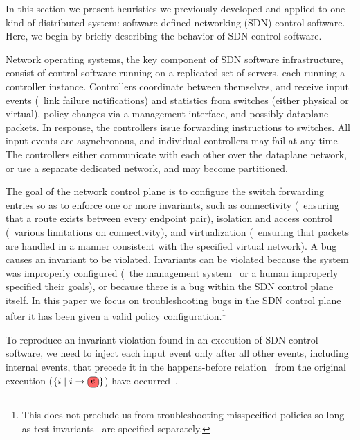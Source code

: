 In this section we present heuristics we previously developed and applied to one kind of
distributed system: software-defined networking (SDN) control software. Here, we begin by briefly describing the behavior of SDN
control software.

 Network operating systems, the key component of SDN software
infrastructure, consist of control software running on a replicated set of
servers, each running a controller instance. Controllers coordinate between
themselves, and receive input events (\eg~link failure notifications) and
statistics from switches (either physical or virtual), policy
changes via a management interface, and possibly dataplane packets.
In response, the
controllers issue forwarding instructions to switches. All input
events are asynchronous, and individual controllers may fail at any
time. The controllers either communicate
with each other over the dataplane network, or use a separate dedicated
network, and may become partitioned.

The goal of the network control plane is to configure the switch forwarding entries so as to
enforce one or more invariants, such as connectivity (\ie~ensuring that a
route exists between every endpoint pair), isolation and access control
(\ie~various limitations on
connectivity), and virtualization (\ie~ensuring that packets are handled
in a manner consistent with the specified virtual network).
A bug causes an invariant to be violated. Invariants can be
violated because the system was improperly configured
(\eg~the management system~\cite{quantum} or a human improperly specified their goals), or
because there is a bug within the SDN control plane itself. In this paper we focus on troubleshooting bugs in the
SDN control plane after it has been given a valid policy configuration.\footnote{This does
not preclude us from troubleshooting misspecified policies
so long as test
invariants~\cite{hsa} are specified separately.}

 To reproduce an invariant
violation found in an execution of SDN control software,
we need to inject each input event \external{} only after all other
events, including internal events,
that precede it in the
happens-before relation~\cite{Lamport:1978:TCO:359545.359563} from the
original execution ($\{i \mid i \rightarrow\!\!\text{\external{}}\}$) have
occurred~\cite{tel2000introduction}.

